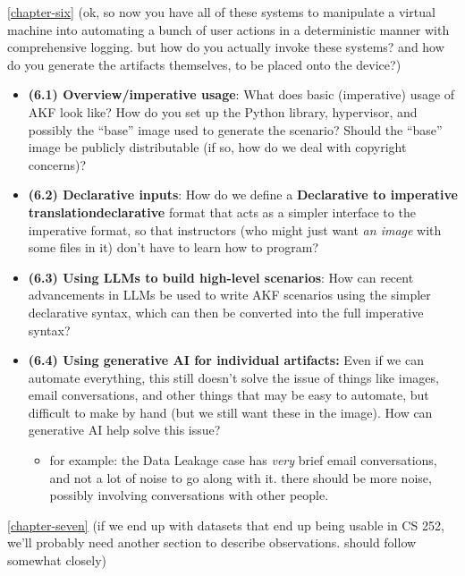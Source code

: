 \autoref{chapter-six} (ok, so now you have all of these
systems to manipulate a virtual machine into automating a bunch of user
actions in a deterministic manner with comprehensive logging. but how do
you actually invoke these systems? and how do you generate the artifacts
themselves, to be placed onto the device?)

\begin{itemize}
\tightlist
\item
  \textbf{(6.1) Overview/imperative usage}: What does basic (imperative)
  usage of AKF look like? How do you set up the Python library,
  hypervisor, and possibly the ``base'' image used to generate the
  scenario? Should the ``base'' image be publicly distributable (if so,
  how do we deal with copyright concerns)?
\item
  \textbf{(6.2) Declarative inputs}: How do we define a
  \textbf{Declarative to imperative translation\textbar declarative}
  format that acts as a simpler interface to the imperative format, so
  that instructors (who might just want \emph{an image} with some files
  in it) don't have to learn how to program?
\item
  \textbf{(6.3) Using LLMs to build high-level scenarios}: How can
  recent advancements in LLMs be used to write AKF scenarios using the
  simpler declarative syntax, which can then be converted into the full
  imperative syntax?
\item
  \textbf{(6.4) Using generative AI for individual artifacts:} Even if
  we can automate everything, this still doesn't solve the issue of
  things like images, email conversations, and other things that may be
  easy to automate, but difficult to make by hand (but we still want
  these in the image). How can generative AI help solve this issue?

  \begin{itemize}
  \tightlist
  \item
    for example: the Data Leakage case has \emph{very} brief email
    conversations, and not a lot of noise to go along with it. there
    should be more noise, possibly involving conversations with other
    people.
  \end{itemize}
\end{itemize}

\autoref{chapter-seven} (if we end up with datasets
that end up being usable in CS 252, we'll probably need another section
to describe observations. should follow
\cite{mochEvaluatingForensicImage2012} somewhat closely)

